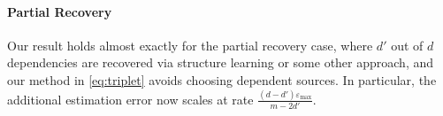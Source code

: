 \paragraph{Partial Recovery} Our result holds almost exactly for the partial recovery case, where $d'$ out of $d$ dependencies are recovered via structure learning or some other approach, and our method in \eqref{eq:triplet} avoids choosing dependent sources. In particular, the additional estimation error now scales at rate $\frac{(d - d') \varepsilon_{\max}  }{m - 2d'}$.




